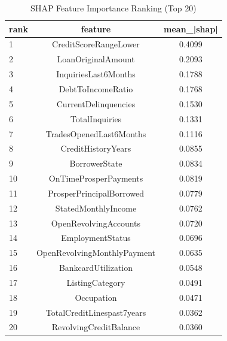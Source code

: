 \begin{table}
\centering
\caption{SHAP Feature Importance Ranking (Top 20)}
\label{tab:shap_ranking}
\begin{tabular}{lcc}
\toprule
rank & feature & mean_|shap| \\
\midrule
1 & CreditScoreRangeLower & 0.4099 \\
2 & LoanOriginalAmount & 0.2093 \\
3 & InquiriesLast6Months & 0.1788 \\
4 & DebtToIncomeRatio & 0.1768 \\
5 & CurrentDelinquencies & 0.1530 \\
6 & TotalInquiries & 0.1331 \\
7 & TradesOpenedLast6Months & 0.1116 \\
8 & CreditHistoryYears & 0.0855 \\
9 & BorrowerState & 0.0834 \\
10 & OnTimeProsperPayments & 0.0819 \\
11 & ProsperPrincipalBorrowed & 0.0779 \\
12 & StatedMonthlyIncome & 0.0762 \\
13 & OpenRevolvingAccounts & 0.0720 \\
14 & EmploymentStatus & 0.0696 \\
15 & OpenRevolvingMonthlyPayment & 0.0635 \\
16 & BankcardUtilization & 0.0548 \\
17 & ListingCategory & 0.0491 \\
18 & Occupation & 0.0471 \\
19 & TotalCreditLinespast7years & 0.0362 \\
20 & RevolvingCreditBalance & 0.0360 \\
\bottomrule
\end{tabular}
\end{table}
